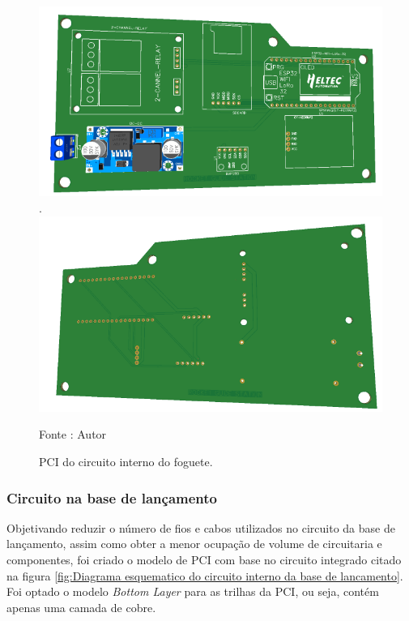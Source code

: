 \begin{figure}[H]
  \centering
  \includegraphics[scale=0.4]{figuras/PCI-FOGUETE TV2.png}.
    \includegraphics[scale=0.4]{figuras/PCI-FOGUETE BV2.png}
  \caption{PCI do circuito interno do foguete. } 
  {\footnotesize Fonte : Autor } 
  \label{fig:PCB_FOGUETE}
\end{figure}





\subsubsection{Circuito na base de lançamento}

Objetivando reduzir o número de fios e cabos utilizados no circuito da base de lançamento, assim como obter a menor ocupação de volume de circuitaria e componentes, foi criado o modelo de PCI com base no circuito integrado citado na figura \ref{fig:Diagrama esquematico do circuito interno da base de lancamento}. Foi optado o modelo \textit{Bottom Layer} para as trilhas da PCI, ou seja, contém apenas uma camada de cobre.

